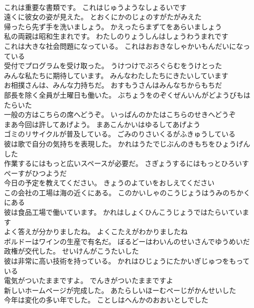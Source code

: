 \documentclass[8pt]{extreport}
\begin{document}
\begin{CJK}{UTF8}{min}
\\	これは重要な書類です。	これはじゅうようなしょるいです 
\\	遠くに彼女の姿が見えた。	とおくにかのじょのすがたがみえた 
\\	帰ったら先ず手を洗いましょう。	かえったらまずてをあらいましょう 
\\	私の両親は昭和生まれです。	わたしのりょうしんはしょうわうまれです 
\\	これは大きな社会問題になっている。	これはおおきなしゃかいもんだいになっている 
\\	受付でプログラムを受け取った。	うけつけでぷろぐらむをうけとった 
\\	みんな私たちに期待しています。	みんなわたしたちにきたいしています 
\\	お相撲さんは、みんな力持ちだ。	おすもうさんはみんなちからもちだ 
\\	部長を除く全員が土曜日も働いた。	ぶちょうをのぞくぜんいんがどようびもはたらいた 
\\	一般の方はこちらの席へどうぞ。	いっぱんのかたはこちらのせきへどうぞ 
\\	まあ今回は許してあげよう。	まあこんかいはゆるしてあげよう 
\\	ゴミのリサイクルが普及している。	ごみのりさいくるがふきゅうしている 
\\	彼は歌で自分の気持ちを表現した。	かれはうたでじぶんのきもちをひょうげんした 
\\	作業するにはもっと広いスペースが必要だ。	さぎょうするにはもっとひろいすぺーすがひつようだ 
\\	今日の予定を教えてください。	きょうのよていをおしえてください 
\\	この会社の工場は海の近くにある。	このかいしゃのこうじょうはうみのちかくにある 
\\	彼は食品工場で働いています。	かれはしょくひんこうじょうではたらいています 
\\	よく答えが分かりましたね。	よくこたえがわかりましたね 
\\	ボルドーはワインの生産で有名だ。	ぼるどーはわいんのせいさんでゆうめいだ 
\\	政権が交代した。	せいけんがこうたいした 
\\	彼は非常に高い技術を持っている。	かれはひじょうにたかいぎじゅつをもっている 
\\	電気がついたままですよ。	でんきがついたままですよ 
\\	新しいホームページが完成した。	あたらしいほーむぺーじがかんせいした 
\\	今年は変化の多い年でした。	ことしはへんかのおおいとしでした 

\end{CJK}
\end{document}
